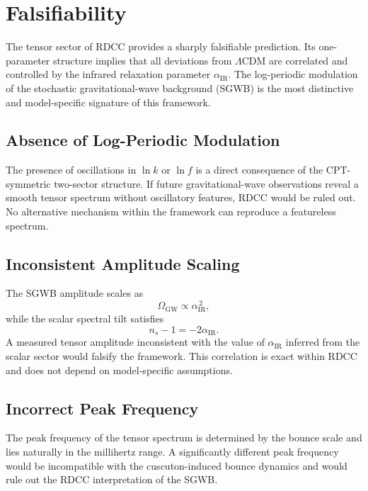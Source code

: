 \documentclass[11pt,a4paper]{article}
\begin{document}
\section{Falsifiability}

The tensor sector of RDCC provides a sharply falsifiable prediction. Its one-parameter
structure implies that all deviations from $\Lambda$CDM are correlated and controlled by
the infrared relaxation parameter $\alpha_{\mathrm{IR}}$. The log-periodic modulation of the
stochastic gravitational-wave background (SGWB) is the most distinctive and model-specific
signature of this framework.

\subsection{Absence of Log-Periodic Modulation}

The presence of oscillations in $\ln k$ or $\ln f$ is a direct consequence of the CPT-symmetric
two-sector structure. If future gravitational-wave observations reveal a smooth tensor
spectrum without oscillatory features, RDCC would be ruled out. No alternative mechanism
within the framework can reproduce a featureless spectrum.

\subsection{Inconsistent Amplitude Scaling}

The SGWB amplitude scales as
\begin{equation}
    \Omega_{\mathrm{GW}} \propto \alpha_{\mathrm{IR}}^{\,2},
\end{equation}
while the scalar spectral tilt satisfies
\begin{equation}
    n_{s} - 1 = -2\alpha_{\mathrm{IR}}.
\end{equation}
A measured tensor amplitude inconsistent with the value of $\alpha_{\mathrm{IR}}$ inferred from
the scalar sector would falsify the framework. This correlation is exact within RDCC and
does not depend on model-specific assumptions.

\subsection{Incorrect Peak Frequency}

The peak frequency of the tensor spectrum is determined by the bounce scale and lies
naturally in the millihertz range. A significantly different peak frequency would be
incompatible with the cuscuton-induced bounce dynamics and would rule out the RDCC
interpretation of the SGWB.
\end{document}
